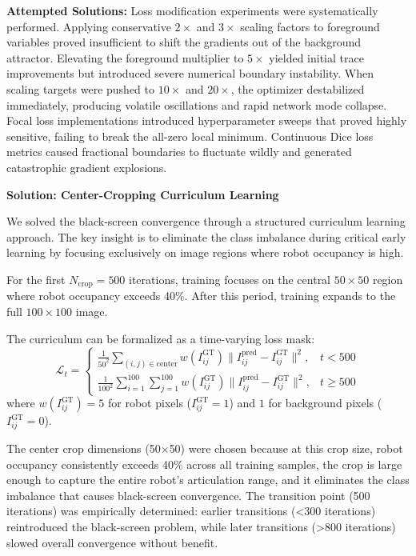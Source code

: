 \documentclass[12pt,a4paper,oneside]{report}
\begin{document}
\textbf{Attempted Solutions:} Loss modification experiments were systematically performed. Applying conservative $2\times$ and $3\times$ scaling factors to foreground variables proved insufficient to shift the gradients out of the background attractor. Elevating the foreground multiplier to $5\times$ yielded initial trace improvements but introduced severe numerical boundary instability. When scaling targets were pushed to $10\times$ and $20\times$, the optimizer destabilized immediately, producing volatile oscillations and rapid network mode collapse. Focal loss implementations introduced hyperparameter sweeps that proved highly sensitive, failing to break the all-zero local minimum. Continuous Dice loss metrics caused fractional boundaries to fluctuate wildly and generated catastrophic gradient explosions.

\textbf{Solution: Center-Cropping Curriculum Learning}

We solved the black-screen convergence through a structured curriculum learning approach. The key insight is to eliminate the class imbalance during critical early learning by focusing exclusively on image regions where robot occupancy is high.

For the first $N_{\text{crop}} = 500$ iterations, training focuses on the central $50 \times 50$ region where robot occupancy exceeds 40\%. After this period, training expands to the full $100 \times 100$ image.

The curriculum can be formalized as a time-varying loss mask:
\begin{equation}
\mathcal{L}_t = \begin{cases}
\frac{1}{50^2} \sum_{(i,j) \in \text{center}} w(I_{ij}^{\text{GT}}) \|I_{ij}^{\text{pred}} - I_{ij}^{\text{GT}}\|^2, & t < 500 \\
\frac{1}{100^2} \sum_{i=1}^{100}\sum_{j=1}^{100} w(I_{ij}^{\text{GT}}) \|I_{ij}^{\text{pred}} - I_{ij}^{\text{GT}}\|^2, & t \geq 500
\end{cases}
\end{equation}
where $w(I_{ij}^{\text{GT}}) = 5$ for robot pixels ($I_{ij}^{\text{GT}} = 1$) and $1$ for background pixels ($I_{ij}^{\text{GT}} = 0$).

The center crop dimensions (50$\times$50) were chosen because at this crop size, robot occupancy consistently exceeds 40\% across all training samples, the crop is large enough to capture the entire robot's articulation range, and it eliminates the class imbalance that causes black-screen convergence. The transition point (500 iterations) was empirically determined: earlier transitions (<300 iterations) reintroduced the black-screen problem, while later transitions (>800 iterations) slowed overall convergence without benefit.
\end{document}

